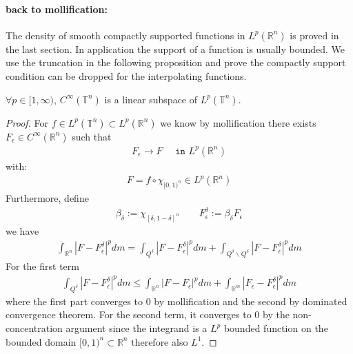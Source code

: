 \paragraph{back to mollification:}
The density of smooth compactly supported functions in $L^p(\mathbb{R}^n)$ is proved in the last section. In application the support of a function is usually bounded. We use the truncation in the following proposition and prove the compactly support condition can be dropped for the interpolating functions. 
\begin{proposition}
	$\forall p \in [1, \infty)$, $C^\infty(\mathbb{T}^n)$ is a linear subspace of $L^p(\mathbb{T}^n)$.
\end{proposition}
\begin{proof}
For $f \in L^p(\mathbb{T}^n) \subset L^p(\mathbb{R}^n)$ we know by mollification there exists $F_\epsilon \in C^\infty(\mathbb{R}^n)$ such that
\begin{align*}
	F_\epsilon \rightarrow F \quad \texttt{ in } L^p(\mathbb{R}^n)
\end{align*}
with:
\begin{align*}
	F = f \circ \chi_{[0, 1)^n} \in L^p(\mathbb{R}^n)
\end{align*}
Furthermore, define 
\begin{align*}
	\beta_\delta := \chi_{[\delta, 1 - \delta]^n} \qquad F_\epsilon^\delta := \beta_\delta F_\epsilon
\end{align*}
we have
\begin{align*}
	\int_{\mathbb{R}^n} | F - F_\epsilon^\delta|^p dm 
	= \int_{Q^\delta} | F - F^\delta_\epsilon|^p dm + \int_{Q^\delta \backslash Q^\delta}|F - F^\delta_\epsilon|^p dm 
\end{align*}
For the first term
\begin{align*}
	\int_{Q^\delta} | F - F^\delta_\epsilon|^p dm 
	\le \int_{\mathbb{R}^n} | F - F_\epsilon|^p dm + \int_{\mathbb{R}^m} | F_\epsilon - F_\epsilon^\delta|^p dm 
\end{align*}
where the first part converges to 0 by mollification and the second by dominated convergence theorem. For the second term, it converges to 0 by the non-concentration argument since the integrand is a $L^p$ bounded function on the bounded domain $[0, 1)^n \subset \mathbb{R}^n$ therefore also $L^1$. 
\end{proof}



